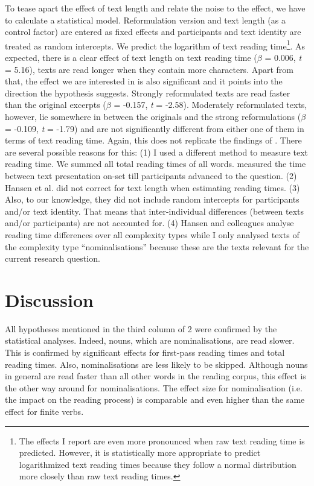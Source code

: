 \documentclass[output=paper]{langsci/langscibook}
\begin{document}
To tease apart the effect of text length and relate the noise to the effect, we have to calculate a statistical model. Reformulation version and text length (as a control factor) are entered as fixed effects and participants and text identity are treated as random intercepts. We predict the logarithm of text reading time\footnote{The effects I report are even more pronounced when raw text reading time is predicted. However, it is statistically more appropriate to predict logarithmized text reading times because they follow a normal distribution more closely than raw text reading times.}. As expected, there is a clear effect of text length on text reading time (\textit{$\beta $} = 0.006, \textit{t} = 5.16), texts are read longer when they contain more characters. Apart from that, the effect we are interested in is also significant and it points into the direction the hypothesis suggests. Strongly reformulated texts are read faster than the original excerpts (\textit{$\beta $} = -0.157, \textit{t} = -2.58). Moderately reformulated texts, however, lie somewhere in between the originals and the strong reformulations (\textit{$\beta $} = -0.109, \textit{t} = -1.79) and are not significantly different from either one of them in terms of text reading time. Again, this does not replicate the findings of \citet{Hansen2006}. There are several possible reasons for this: (1) I used a different method to measure text reading time. We summed all total reading times of all words. \citet{Hansen2006} measured the time between text presentation on-set till participants advanced to the question. (2) Hansen et al. did not correct for text length when estimating reading times. (3) Also, to our knowledge, they did not include random intercepts for participants and/or text identity. That means that inter-individual differences (between texts and/or participants) are not accounted for.\label{bkm:Ref283726149} (4) Hansen and colleagues analyse reading time differences over all complexity types while I only analysed texts of the complexity type “nominalisations” because these are the texts relevant for the current research question. 

\section{Discussion}

All hypotheses mentioned in the third column of 2 were confirmed by the statistical analyses. Indeed, nouns, which are nominalisations, are read slower. This is confirmed by significant effects for first-pass reading times and total reading times. Also, nominalisations are less likely to be skipped. Although nouns in general are read faster than all other words in the reading corpus, this effect is the other way around for nominalisations. The effect size for nominalisation (i.e. the impact on the reading process) is comparable and even higher than the same effect for finite verbs.
\end{document}

